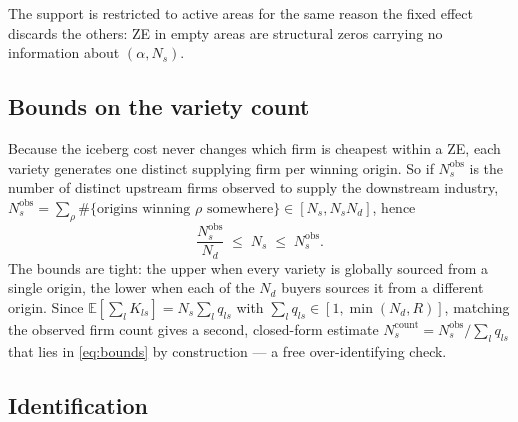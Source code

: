 \documentclass[11pt]{article}
\newcommand{\E}{\mathbb{E}}
\newcommand{\Nd}{N_{d}}
\begin{document}
The support is restricted to active areas for the same reason the fixed effect discards the
others: ZE in empty areas are structural zeros carrying no information about $(\alpha,N_{s})$.

\subsection{Bounds on the variety count}
\label{sec:bounds}

Because the iceberg cost never changes which firm is cheapest within a ZE, each variety generates
one distinct supplying firm per winning origin. So if $N^{\mathrm{obs}}_{s}$ is the number of
distinct upstream firms observed to supply the downstream industry,
$N^{\mathrm{obs}}_{s}=\sum_{\rho}\#\{\text{origins winning }\rho\text{ somewhere}\}\in[N_{s},N_{s}\Nd]$,
hence
\begin{equation}
\frac{N^{\mathrm{obs}}_{s}}{\Nd}\;\le\;N_{s}\;\le\;N^{\mathrm{obs}}_{s} .
\label{eq:bounds}
\end{equation}
The bounds are tight: the upper when every variety is globally sourced from a single origin, the
lower when each of the $\Nd$ buyers sources it from a different origin. Since
$\E[\sum_{l}K_{ls}]=N_{s}\sum_{l}q_{ls}$ with $\sum_{l}q_{ls}\in[1,\min(\Nd,R)]$, matching the
observed firm count gives a second, closed-form estimate
$N^{\mathrm{count}}_{s}=N^{\mathrm{obs}}_{s}/\sum_{l}q_{ls}$ that lies in \eqref{eq:bounds} by
construction --- a free over-identifying check.

\subsection{Identification}
\label{sec:identification}
\end{document}
